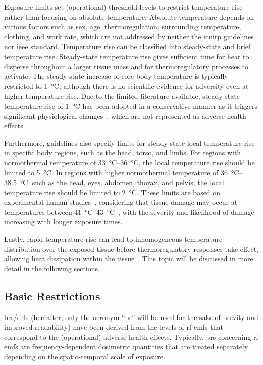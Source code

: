 Exposure limits set (operational) threshold levels to restrict temperature rise rather than focusing on absolute temperature.
Absolute temperature depends on various factors such as sex, age, thermoregulation, surrounding temperature, clothing, and work rate, which are not addressed by neither the \gls{icnirp} guidelines nor \gls{ieee} standard.
Temperature rise can be classified into steady-state and brief temperature rise.
Steady-state temperature rise gives sufficient time for heat to disperse throughout a larger tissue mass and for thermoregulatory processes to activate.
The steady-state increase of core body temperature is typically restricted to \SI{1}{\celsius}, although there is no scientific evidence for adversity even at higher temperature rise.
Due to the limited literature available, steady-state temperature rise of \SI{1}{\celsius} has been adopted in a conservative manner as it triggers significant physiological changes~\cite{Heuvel2017independent}, which are not represented as adverse health effects.

Furthermore, guidelines also specify limits for steady-state local temperature rise in specific body regions, such as the head, torso, and limbs.
For regions with normothermal temperature of \SIrange{33}{36}{\celsius}, the local temperature rise should be limited to \SI{5}{\celsius}.
In regions with higher normothermal temperature of \SIrange{36}{38.5}{\celsius}, such as the head, eyes, abdomen, thorax, and pelvis, the local temperature rise should be limited to \SI{2}{\celsius}.
These limits are based on experimental human studies~\cite{Walters2000Heating}, considering that tissue damage may occur at temperatures between \SIrange{41}{43}{\celsius}~\cite{Dewhirst2003Basic}, with the severity and likelihood of damage increasing with longer exposure times.

Lastly, rapid temperature rise can lead to inhomogeneous temperature distribution over the exposed tissue before thermoregulatory responses take effect, allowing heat dissipation within the tissue~\cite{Foster2016Thermal,Foster2017Thermal,Laakso2017Human,Kodera2018Brief}.
This topic will be discussed in more detail in the following sections.

\subsection{Basic Restrictions}
\Gls{br}s/\gls{drl}s (hereafter, only the acronym ``\gls{br}'' will be used for the sake of brevity and improved readability) have been derived from the levels of \gls{rf} \gls{emf}s that correspond to the (operational) adverse health effects.
Typically, \gls{br}s concerning \gls{rf} \gls{emf}s are frequency-dependent dosimetric quantities that are treated separately depending on the spatio-temporal scale of exposure.

